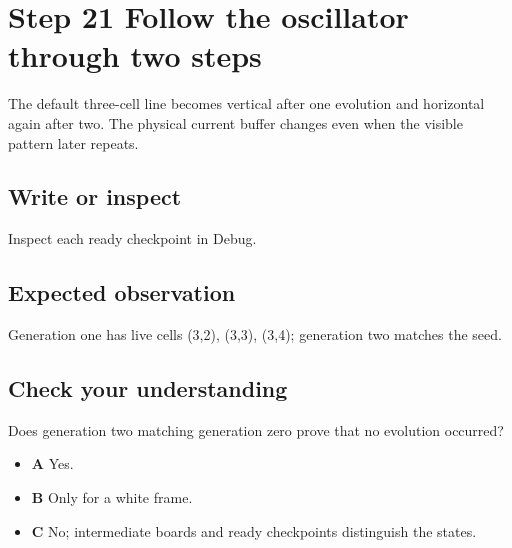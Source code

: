 \section{Step 21 Follow the oscillator through two
  steps}\label{008-life-generations-s21-step-21-follow-the-oscillator-through-two-steps}

The default three-cell line becomes vertical after one evolution and
horizontal again after two. The physical current buffer changes even
when the visible pattern later repeats.

\subsection{Write or
  inspect}\label{008-life-generations-s21-write-or-inspect}

Inspect each ready checkpoint in Debug.

\subsection{Expected
  observation}\label{008-life-generations-s21-expected-observation}

Generation one has live cells (3,2), (3,3), (3,4); generation two
matches the seed.

\subsection{Check your
  understanding}\label{008-life-generations-s21-check-your-understanding}

Does generation two matching generation zero prove that no evolution
occurred?

\begin{itemize}
  \tightlist
  \item
        \textbf{A} Yes.
  \item
        \textbf{B} Only for a white frame.
  \item
        \textbf{C} No; intermediate boards and ready checkpoints distinguish
        the states.
\end{itemize}
